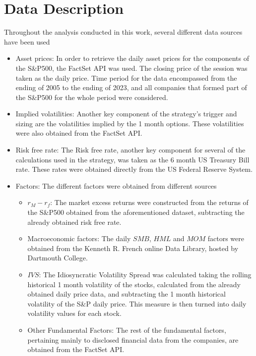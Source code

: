 \section{Data Description}
Throughout the analysis conducted in this work, several different data sources have been used
\begin{itemize}
    \item Asset prices: In order to retrieve the daily asset prices for the components of the S\&P500, the FactSet API was used. The closing price of the session was taken as the daily price. Time period for the data encompassed from the ending of 2005 to the ending of 2023, and all companies that formed part of the S\&P500 for the whole period were considered. 
    \item Implied volatilities: Another key component of the strategy's trigger and sizing are the volatilities implied by the 1 month options. These volatilities were also obtained from the FactSet API. 
    \item Risk free rate: The Risk free rate, another key component for several of the calculations used in the strategy, was taken as the 6 month US Treasury Bill rate. These rates were obtained directly from the US Federal Reserve System.
    \item Factors: The different factors were obtained from different sources
    \begin{itemize}
        \item $r_M-r_f$: The market excess returns were constructed from the returns of the S\&P500 obtained from the aforementioned dataset, subtracting the already obtained risk free rate.
        \item Macroeconomic factors: The daily $SMB$, $HML$ and $MOM$ factors were obtained from the Kenneth R. French online Data Library, hosted by Dartmouth College.
        \item $IVS$: The Idiosyncratic Volatility Spread was calculated taking the rolling historical 1 month volatility of the stocks, calculated from the already obtained daily price data, and subtracting the 1 month historical volatility of the S\&P daily price. This measure is then turned into daily volatility values for each stock. 
        \item Other Fundamental Factors: The rest of the fundamental factors, pertaining mainly to disclosed financial data from the companies, are obtained from the FactSet API. 
    \end{itemize}
\end{itemize}